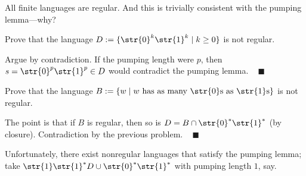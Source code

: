 \begin{remark}
    All finite languages are regular.
    And this is trivially consistent with the pumping lemma---why?
\end{remark}

\begin{problem}
    Prove that the language $D := \{\str{0}^k \str{1}^k \mid k \geq 0\}$ is not regular.
\end{problem}

\begin{solution}
    Argue by contradiction.
    If the pumping length were $p$,
    then $s = \str{0}^p\str{1}^p \in D$ would contradict the pumping lemma.
    ~ $\blacksquare$
\end{solution}

\begin{problem}
    Prove that the language $B := \{w \mid w
    \text{ has as many } \str{0}\text{s} \text{ as } \str{1}\text{s}\}$
    is not regular.
\end{problem}

\begin{solution}
    The point is that if $B$ is regular,
    then so is $D = B \cap \str{0}^*\str{1}^*$ (by closure).
    Contradiction by the previous problem.
    ~ $\blacksquare$
\end{solution}

Unfortunately, there exist nonregular languages
that satisfy the pumping lemma;
take $\str{1}\str{1}^*D \cup \str{0}^*\str{1}^*$ with pumping length $1$, say.

